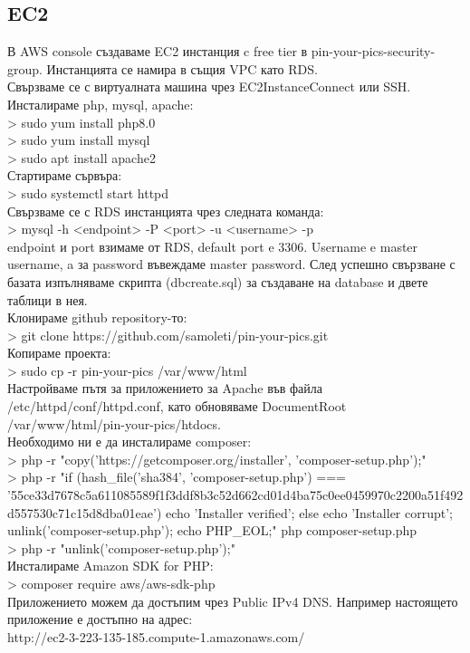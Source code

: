 \documentclass[12pt]{article}
\begin{document}
\subsection{EC2}
 В AWS console създаваме EC2 инстанция c free tier в pin-your-pics-security-group. Инстанцията се намира в същия VPC като RDS. \\
 Свързваме се с виртуалната машина чрез EC2InstanceConnect или SSH. \\
 Инсталираме php, mysql, apache: \\
 > sudo yum install php8.0 \\
 > sudo yum install mysql \\
 > sudo apt install apache2 \\
 Стартираме сървъра: \\
 > sudo systemctl start httpd \\
 Свързваме се с RDS инстанцията чрез следната команда: \\
 > mysql -h <endpoint> -P <port> -u <username> -p \\
 endpoint и port взимаме от RDS, default port e 3306. Username e master username, a за password въвеждаме master password.
 След успешно свързване с базата изпълняваме скрипта (dbcreate.sql) за създаване на database и двете таблици в нея. \\
 Клонираме github repository-то: \\
 > git clone https://github.com/samoleti/pin-your-pics.git \\
 Копираме проекта: \\
 > sudo cp -r pin-your-pics /var/www/html \\
 Настройваме пътя за приложението за Apache във файла /etc/httpd/conf/httpd.conf, като обновяваме DocumentRoot /var/www/html/pin-your-pics/htdocs. \\
 Необходимо ни е да инсталираме composer: \\
 > php -r "copy('https://getcomposer.org/installer', 'composer-setup.php');" \\
 > php -r "if (hash\_file('sha384', 'composer-setup.php') === \\ '55ce33d7678c5a611085589f1f3ddf8b3c52d662cd01d4ba75c0ee0459970c2200a51f492d557530c71c15d8dba01eae') { echo 'Installer verified'; } else { echo 'Installer corrupt'; unlink('composer-setup.php'); } echo PHP\_EOL;"
  php composer-setup.php \\
 > php -r "unlink('composer-setup.php');" \\
 Инсталираме Amazon SDK for PHP: \\ 
 > composer require aws/aws-sdk-php \\
Приложението можем да достъпим чрез Public IPv4 DNS. Например настоящето приложение е достъпно на адрес: \\
 http://ec2-3-223-135-185.compute-1.amazonaws.com/
 
\end{document}
